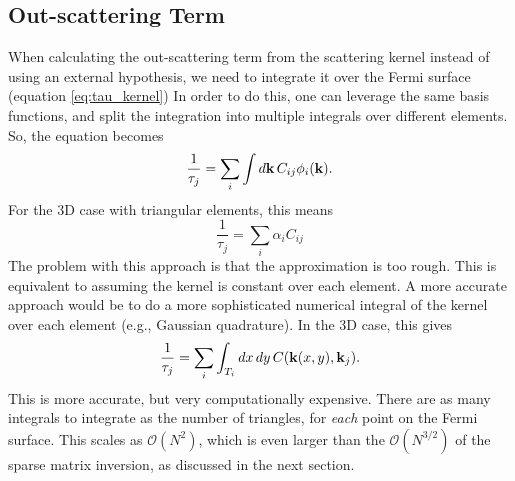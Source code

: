 \documentclass[12pt]{article}
\begin{document}
\subsection{Out-scattering Term}
When calculating the out-scattering term from the scattering kernel instead of using an external
hypothesis, we need to integrate it over the Fermi surface (equation \eqref{eq:tau_kernel})
In order to do this, one can leverage the same basis functions, and split the integration into
multiple integrals over different elements. So, the equation becomes
\begin{equation}
    \frac{1}{\tau_j} = \sum_i \int\dd{\vb{k}} C_{ij} \phi_i(\vb{k}).
\end{equation}
For the 3D case with triangular elements, this means
\begin{equation}
    \frac{1}{\tau_j} = \sum_i \alpha_i C_{ij}
\end{equation}
The problem with this approach is that the approximation is too rough. This is equivalent to
assuming the kernel is constant over each element. A more accurate approach would be to do a more
sophisticated numerical integral of the kernel over each element (e.g., Gaussian quadrature).
In the 3D case, this gives
\begin{equation}
    \frac{1}{\tau_j} = \sum_{i}\int_{T_i} \dd{x}\dd{y} C(\vb{k}(x,y), \vb{k}_j).
\end{equation}
This is more accurate, but very computationally expensive. There are as many integrals to integrate
as the number of triangles, for \emph{each} point on the Fermi surface.
This scales as $\mathcal{O}(N^2)$, which is even larger than the $\mathcal{O}(N^{3/2})$ of the
sparse matrix inversion, as discussed in the next section.
\end{document}
